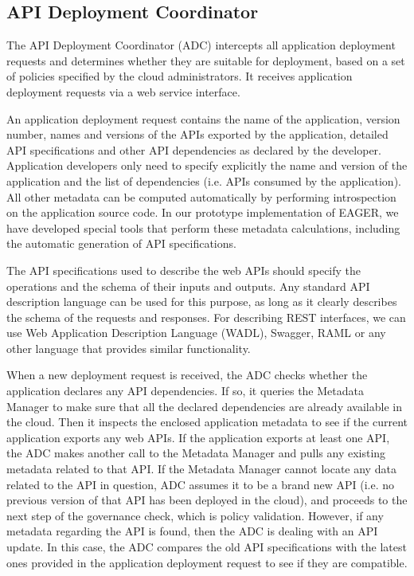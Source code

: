 \subsection{API Deployment Coordinator} 
The API Deployment Coordinator (ADC)
intercepts all application deployment requests and determines whether they are
suitable for deployment, based on a set of policies specified by the cloud
administrators. It receives application deployment requests via a web service
interface.

An application deployment request contains the name of the application,
version number, names and versions of the APIs exported by the application,
detailed API specifications and other API dependencies as declared by the
developer. Application developers only need to specify explicitly the name and
version of the application and the list of dependencies (i.e. APIs consumed by
the application). All other metadata can be computed automatically by
performing introspection on the application source code. In our prototype
implementation of EAGER, we have developed special tools that perform these
metadata calculations, including the automatic generation of API
specifications.

The API specifications used to describe the web APIs should specify the
operations and the schema of their inputs and outputs.  Any standard API
description language can be used for this purpose, as long as it clearly
describes the schema of the requests and responses. For describing REST
interfaces, we can use Web Application Description Language (WADL), Swagger,
RAML or any other language that provides similar functionality. %

When a new deployment request is received, the ADC checks whether the
application declares any API dependencies. If so, it queries the Metadata
Manager to make sure that all the declared dependencies are already available
in the cloud.  Then it inspects the enclosed application metadata to see if
the current application exports any web APIs. If the application exports at
least one API, the ADC makes another call to the Metadata Manager and pulls
any existing metadata related to that API. If the Metadata Manager cannot
locate any data related to the API in question, ADC assumes it to be a brand
new API (i.e. no previous version of that API has been deployed in the cloud),
and proceeds to the next step of the governance check, which is policy
validation. However, if any metadata regarding the API is found, then the ADC
is dealing with an API update. In this case, the ADC compares the old API
specifications with the latest ones provided in the application deployment
request to see if they are compatible.

